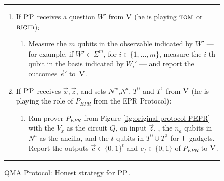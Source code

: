 \begin{figure}[H]
\rule[1ex]{\textwidth}{0.5pt}
\vspace{-20pt}
\begin{enumerate}
  \item If $\textsc{PP}$ receives a question ${W}'$ from $\textsc{V}$ (he is playing $\textsc{tom}$ or $\textsc{rigid}$):
\begin{enumerate}
     \item[]  Measure the $m$ qubits in the observable indicated by $W'$ --- for example, if $W'\in\Sigma^m$, for $i\in \{1,\ldots,m\}$, measure the $i$-th qubit in the basis indicated by $W_i'$ --- and report
       the outcomes $\vec{e}'$ to~$\textsc{V}$.
\end{enumerate}
\item If $\textsc{PP}$ receives $\vec{x}, \vec{z}$, and sets $N^w$,$N^a$, $T^0$ and $T^1$ from $\textsc{V}$ (he is playing the role of $P_{EPR}$ from the EPR Protocol):
\begin{enumerate}
     \item[] Run  prover $P_{EPR}$ from Figure
       \ref{fig:original-protocol-PEPR} with the $V_x$ as the circuit $Q$, on input $\vec{z}$, , the $n_a$ qubits in 
        $N^a$ as the ancilla, and the $t$ qubits in $T^0\cup T^1$ for $\sf T$ gadgets.
     Report the outputs $\vec{c}\in\{0,1\}^t$ and $c_f\in\{0,1\}$ of $P_{EPR}$  to $\textsc{V}$. 
\end{enumerate}
\end{enumerate}
\rule[2ex]{\textwidth}{0.5pt}\vspace{-.5cm}
\caption{QMA Protocol: Honest strategy for $\textsc{PP}$.}\label{fig:qma-protocol-PP}
\end{figure}

\clearpage

